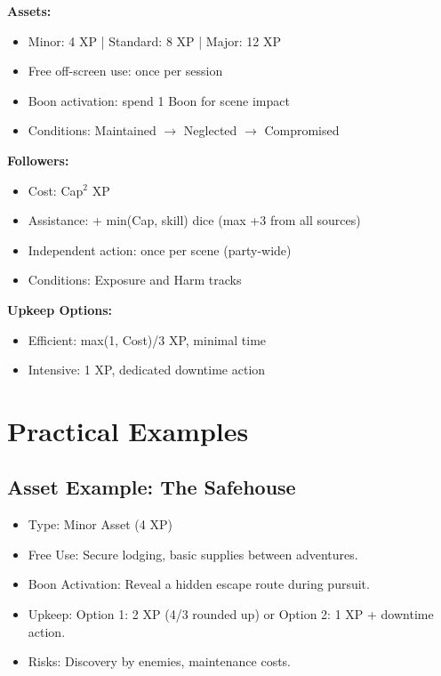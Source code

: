 \documentclass[11pt,twoside,openany]{book}
\begin{document}
\begin{tcolorbox}[colback=gray!5!white, colframe=gray!75!black, title=Assets and Followers Quick Reference, fonttitle=\bfseries,breakable]
\textbf{Assets:}
\begin{itemize}
\item Minor: 4 XP | Standard: 8 XP | Major: 12 XP
\item Free off-screen use: once per session
\item Boon activation: spend 1 Boon for scene impact
\item Conditions: Maintained $\rightarrow$ Neglected $\rightarrow$ Compromised
\end{itemize}

\textbf{Followers:}
\begin{itemize}
\item Cost: Cap$^2$ XP
\item Assistance: + min(Cap, skill) dice (max +3 from all sources)
\item Independent action: once per scene (party-wide)
\item Conditions: Exposure and Harm tracks
\end{itemize}

\textbf{Upkeep Options:}
\begin{itemize}
\item Efficient: max(1, Cost)/3 XP, minimal time
\item Intensive: 1 XP, dedicated downtime action
\end{itemize}
\end{tcolorbox}

\section*{Practical Examples} 

\subsection*{Asset Example: The Safehouse}

\begin{itemize}
\item Type: Minor Asset (4 XP)
\item Free Use: Secure lodging, basic supplies between adventures.
\item Boon Activation: Reveal a hidden escape route during pursuit.
\item Upkeep: Option 1: 2 XP (4/3 rounded up) or Option 2: 1 XP + downtime action.
\item Risks: Discovery by enemies, maintenance costs.
\end{itemize}
\end{document}
